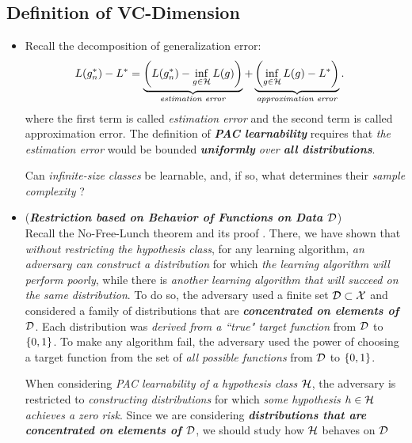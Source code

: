 \documentclass[11pt]{article}
\begin{document}
\subsection{Definition of VC-Dimension}
\begin{itemize}
\item \begin{remark}
Recall the decomposition of generalization error:
\begin{align*}
L(g_n^{*}) - L^{*} &=\underbrace{\left(L(g_n^{*}) - \inf_{g \in {\mathcal H}}L(g)\right)}_{\text{\emph{estimation error}}} + \underbrace{\left(\inf_{g \in {\mathcal H}}L(g) - L^{*}\right)}_{\text{\emph{approximation error}}}.
\end{align*} 
where the first term is called \emph{estimation error} and the second term is called approximation error.  The definition of \emph{\textbf{PAC learnability}} requires that \emph{the estimation error} would be bounded \emph{\textbf{uniformly} over \textbf{all distributions}}.

Can \emph{infinite-size classes} be learnable, and, if so, what determines their \emph{sample complexity} ?
\end{remark}

\item \begin{remark} (\emph{\textbf{Restriction based on Behavior of Functions on Data ${\mathcal D}$}})\\
Recall the No-Free-Lunch theorem and its proof \citep{shalev2014understanding}. There, we have shown that \emph{without restricting the hypothesis class}, for any learning algorithm, \emph{an adversary can construct a distribution} for which \emph{the learning algorithm will perform poorly}, while there is \emph{another learning algorithm that will succeed on the same distribution}. To do so, the adversary used a finite set ${\mathcal D} \subset {\mathcal X}$ and considered a family of distributions that are
\emph{\textbf{concentrated on elements of ${\mathcal D}$}}. Each distribution was \emph{derived from a ``true" target function} from ${\mathcal D}$ to $\left\{0,1\right\}$. To make any algorithm fail, the adversary used the power of choosing a target function from the set of \emph{all possible functions} from ${\mathcal D}$ to $\left\{0,1\right\}$.

When considering \emph{PAC learnability of a hypothesis class ${\mathcal H}$}, the adversary is restricted to \emph{constructing distributions} for which \emph{some hypothesis $h \in {\mathcal H}$ achieves a zero risk}. Since we are considering \emph{\textbf{distributions that are concentrated on elements of ${\mathcal D}$}}, we should study how ${\mathcal H}$ behaves on ${\mathcal D}$
\end{remark}


\end{itemize}
\end{document}
